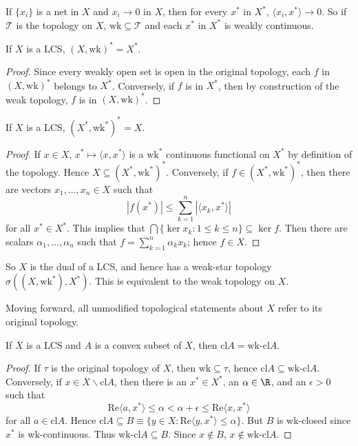 If $\{x_i\}$ is a net in $X$ and $x_i\rightarrow 0$ in $X$, then for every $x^*$ in $X^*$, $\langle x_i,x^*\rangle\rightarrow 0$. So if $\mathcal{T}$ is the topology on $X$, $\text{wk} \subseteq \mathcal{T}$ and each $x^*$ in $X^*$ is weakly continuous.

\begin{thm}
    If $X$ is a LCS, $(X,\text{wk})^* = X^*$.
\end{thm}
\begin{proof}
    Since every weakly open set is open in the original topology, each $f$ in $(X,\text{wk})^*$ belongs to $X^*$. Conversely, if $f$ is in $X^*$, then by construction of the weak topology, $f$ is in $(X,\text{wk})^*$.
\end{proof}

\begin{thm}
    If $X$ is a LCS, $(X^*,\text{wk}^*)^* = X$.
\end{thm}
\begin{proof}
    If $x \in X$, $x^*\mapsto \langle x,x^*\rangle$ is a $\text{wk}^*$ continuous functional on $X^*$ by definition of the topology. Hence $X \subseteq (X^*,\text{wk}^*)^*$. Conversely, if $f \in (X^*,\text{wk}^*)^*$, then there are vectors $x_1,...,x_n \in X$ such that $$|f(x^*)| \leq \sum_{k=1}^n|\langle x_k,x^*\rangle|$$
    for all $x^* \in X^*$. This implies that $\bigcap\{\ker x_k:1\leq k \leq n\} \subseteq \ker f$. Then there are scalars $\alpha_1,...,\alpha_n$ such that $f = \sum_{k=1}^n\alpha_kx_k$; hence $f \in X$.
\end{proof}

So $X$ is the dual of a LCS, and hence has a weak-star topology $\sigma((X,\text{wk}^*),X^*)$. This is equivalent to the weak topology on $X$. 

Moving forward, all unmodified topological statements about $X$ refer to its original topology. 

\begin{thm}
    If $X$ is a LCS and $A$ is a convex subset of $X$, then $\text{cl}A = \text{wk-cl}A$.
\end{thm}
\begin{proof}
    If $\tau$ is the original topology of $X$, then $\text{wk} \subseteq \tau$, hence $\text{cl}A \subseteq \text{wk-cl}A$. Conversely, if $x \in X\backslash\text{cl}A$, then there is an $x^* \in X^*$, an $\alpha \in \R$, and an $\epsilon > 0$ such that $$\text{Re}\langle a,x^*\rangle \leq \alpha < \alpha + \epsilon \leq \text{Re}\langle x,x^*\rangle$$
    for all $a \in \text{cl}A$. Hence $\text{cl}A \subseteq B \equiv \{y \in X:\text{Re}\langle y,x^*\rangle \leq \alpha\}$. But $B$ is wk-closed since $x^*$ is wk-continuous. Thus $\text{wk-cl}A \subseteq B$. Since $x \notin B$, $x \notin\text{wk-cl}A$.
\end{proof}


